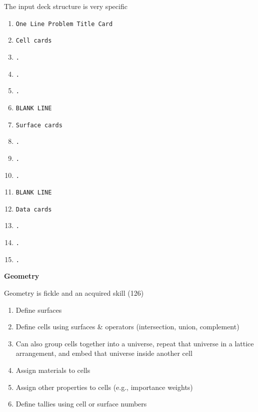 \documentclass[aspectratio=1610,pdftex,dvipsnames,compress,xcolor={dvipsnames}]{beamer}
\begin{document}
\begin{frame}{The input deck structure is very specific}
    \begin{enumerate}[series=outerlist,topsep=0pt,itemsep=0pt,leftmargin=*,label=(\arabic*)]
        \item[]\texttt{One Line Problem Title Card}
        \item[]\texttt{Cell cards}
        \item[]\texttt{.}
        \item[]\texttt{.}
        \item[]\texttt{.}
        \item[]\texttt{BLANK LINE}
        \item[]\texttt{Surface cards}
        \item[]\texttt{.}
        \item[]\texttt{.}
        \item[]\texttt{.}
        \item[]\texttt{BLANK LINE}
        \item[]\texttt{Data cards}
        \item[]\texttt{.}
        \item[]\texttt{.}
        \item[]\texttt{.}
    \end{enumerate}
\end{frame}


\begin{frame}[plain]{}
    \centering\LARGE\textbf{Geometry}
\end{frame}


\addtocounter{framenumber}{-1} 
\begin{frame}{Geometry is fickle and an acquired skill (126)}
    \begin{enumerate}[series=outerlist,topsep=0pt,itemsep=21pt,leftmargin=*,label=(\arabic*)]
        \item[]Define surfaces
        \item[]Define cells using surfaces \& operators (intersection, union, complement)
        \item[]Can also group cells together into a universe, repeat that universe in a lattice arrangement, and embed that universe inside another cell
        \item[]Assign materials to cells
        \item[]Assign other properties to cells (e.g., importance weights)
        \item[]Define tallies using cell or surface numbers
    \end{enumerate}
\end{frame}
\end{document}

